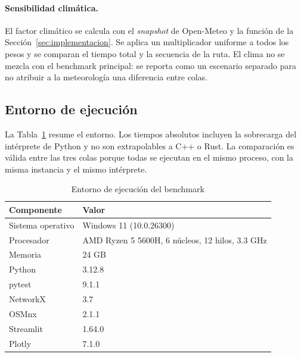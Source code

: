 \paragraph{Sensibilidad climática.} El factor climático se calcula con el \textit{snapshot} de Open-Meteo y la función de la Sección~\ref{sec:implementacion}. Se aplica un multiplicador uniforme a todos los pesos y se comparan el tiempo total y la secuencia de la ruta. El clima no se mezcla con el benchmark principal: se reporta como un escenario separado para no atribuir a la meteorología una diferencia entre colas.

\subsection{Entorno de ejecución}
La Tabla~\ref{tab:entorno} resume el entorno. Los tiempos absolutos incluyen la sobrecarga del intérprete de Python y no son extrapolables a C++ o Rust. La comparación es válida entre las tres colas porque todas se ejecutan en el mismo proceso, con la misma instancia y el mismo intérprete.

\begin{table}[H]
    \centering
    \fontsize{9.5}{11.5}\selectfont
    \caption{Entorno de ejecución del benchmark}
    \label{tab:entorno}
    \begin{tabular}{@{}ll@{}}
        \toprule
        \textbf{Componente} & \textbf{Valor} \\
        \midrule
        Sistema operativo & Windows 11 (10.0.26300) \\
        Procesador & AMD Ryzen 5 5600H, 6 núcleos, 12 hilos, 3.3 GHz \\
        Memoria & 24 GB \\
        Python & 3.12.8 \\
        pytest & 9.1.1 \\
        NetworkX & 3.7 \\
        OSMnx & 2.1.1 \\
        Streamlit & 1.64.0 \\
        Plotly & 7.1.0 \\
        \bottomrule
    \end{tabular}
\end{table}

